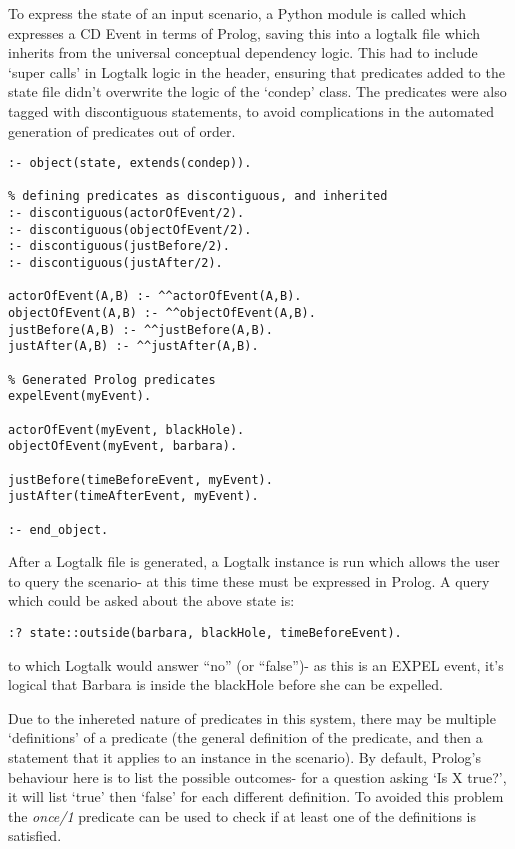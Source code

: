 \documentclass[report]{subfiles}
\begin{document}
    To express the state of an input scenario, a Python module is called which expresses a CD Event in terms of Prolog, saving this into a logtalk file which inherits from the universal conceptual dependency logic. This had to include `super calls' in Logtalk logic in the header, ensuring that predicates added to the state file didn't overwrite the logic of the `condep' class. The predicates were also tagged with discontiguous statements, to avoid complications in the automated generation of predicates out of order. 

\begin{lstlisting}[caption={An example `state', inhereiting from the `condep' Logtalk object},]
:- object(state, extends(condep)).

% defining predicates as discontiguous, and inherited
:- discontiguous(actorOfEvent/2).
:- discontiguous(objectOfEvent/2).
:- discontiguous(justBefore/2).
:- discontiguous(justAfter/2).

actorOfEvent(A,B) :- ^^actorOfEvent(A,B).
objectOfEvent(A,B) :- ^^objectOfEvent(A,B).
justBefore(A,B) :- ^^justBefore(A,B).
justAfter(A,B) :- ^^justAfter(A,B).

% Generated Prolog predicates
expelEvent(myEvent).

actorOfEvent(myEvent, blackHole).
objectOfEvent(myEvent, barbara).

justBefore(timeBeforeEvent, myEvent).
justAfter(timeAfterEvent, myEvent).		

:- end_object.
\end{lstlisting}

After a Logtalk file is generated, a Logtalk instance is run which allows the user to query the scenario- at this time these must be expressed in Prolog. A query which could be asked about the above state is:
\begin{lstlisting}
:? state::outside(barbara, blackHole, timeBeforeEvent).
\end{lstlisting}
to which Logtalk would answer ``no'' (or ``false'')- as this is an EXPEL event, it's logical that Barbara is inside the blackHole before she can be expelled.


Due to the inhereted nature of predicates in this system, there may be multiple `definitions' of a predicate (the general definition of the predicate, and then a statement that it applies to an instance in the scenario). By default, Prolog's behaviour here is to list the possible outcomes- for a question asking `Is X true?', it will list `true' then `false' for each different definition. To avoided this problem the \textit{once/1} predicate can be used to check if at least one of the definitions is satisfied.
\end{document}
